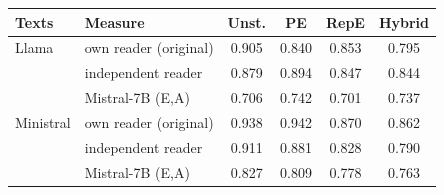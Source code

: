 \begin{tabular}{llcccc}
\toprule
Texts & Measure & Unst. & PE & RepE & Hybrid \\
\midrule
Llama & own reader (original) & 0.905 & 0.840 & 0.853 & 0.795 \\
 & independent reader & 0.879 & 0.894 & 0.847 & 0.844 \\
 & Mistral-7B (E,A) & 0.706 & 0.742 & 0.701 & 0.737 \\
\midrule
Ministral & own reader (original) & 0.938 & 0.942 & 0.870 & 0.862 \\
 & independent reader & 0.911 & 0.881 & 0.828 & 0.790 \\
 & Mistral-7B (E,A) & 0.827 & 0.809 & 0.778 & 0.763 \\
\bottomrule
\end{tabular}
